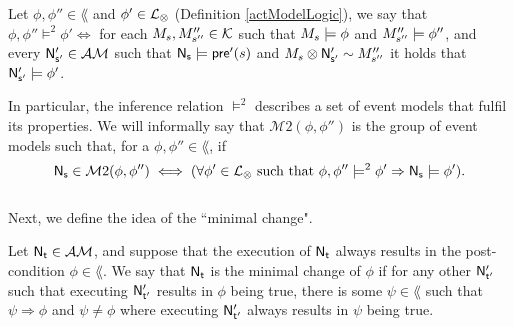 \begin{defn}
	Let $\phi, \phi'' \in \lang$ and $\phi' \in \mathcal{L}_{\otimes}$ (Definition \ref{actModelLogic}), we say that
$\phi, \phi'' \models^2 \phi' \iff$ for each $M_s, M''_{s''} \in \mathcal{K}$
such that $M_s \models \phi$ and $M''_{s''} \models \phi''$, and every $\mathrm{\mathsf{N}}'_{\mathrm{\mathsf{s}}'}
\in \mathcal{AM}$ such that $\mathrm{\mathsf{N}}_\mathrm{\mathsf{s}} \models \mathrm{\mathsf{pre}}'(s)$ and $M_s \otimes \mathrm{\mathsf{N}}'_{\mathrm{\mathsf{s}}'}
\sim M''_{s''}$ it holds that $\mathrm{\mathsf{N}}'_{\mathrm{\mathsf{s}}'} \models \phi'$.
\end{defn}

In particular, the inference relation $\models^2$ describes a set of event models that fulfil its
properties.
We will informally say that $\mathcal{M}2(\phi,\phi'')$ is the group of event models such that, for a $\phi,
	 \phi'' \in \lang$, if
\[
	 \mathrm{\mathsf{N}}_\mathrm{\mathsf{s}} \in \mathcal{M}2(\phi,\phi'') \iff (\forall \phi' \in \mathcal{L}_{\otimes}
	 \text{ such that } \phi,\phi'' \models^2 \phi' \Rightarrow \mathrm{\mathsf{N}}_\mathrm{\mathsf{s}} \models \phi').
\]
\\
Next, we define the idea of the ``minimal change".

\begin{defn}
Let $\mathrm{\mathsf{N}}_\mathrm{\mathsf{t}} \in \mathcal{AM}$, and suppose that the execution of $\mathrm{\mathsf{N}}_\mathrm{\mathsf{t}}$ always results in the
post-condition $\phi \in \lang$.
We say that $\mathrm{\mathsf{N}}_\mathrm{\mathsf{t}}$ is the minimal change of $\phi$ if for any other $\mathrm{\mathsf{N}}'_{\mathrm{\mathsf{t}}'}$ such that
executing $\mathrm{\mathsf{N}}'_{\mathrm{\mathsf{t}}'}$ results in $\phi$ being true, there is some $\psi \in \lang$ such that $\psi \Rightarrow
\phi$ and $\psi \neq \phi$ where executing $\mathrm{\mathsf{N}}'_{\mathrm{\mathsf{t}}'}$ always results in $\psi$ being true.
\end{defn}

